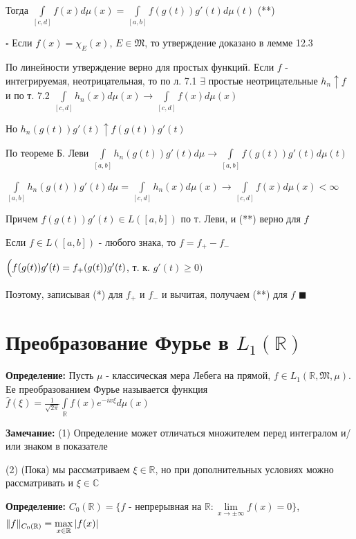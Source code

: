 \documentclass[a4paper]{report}
\newcommand*{\hm}[1]{#1\nobreak\discretionary{}%
            {\hbox{$\mathsurround=0pt #1$}}{}}
\begin{document}
Тогда $\displaystyle\int\limits_{[c,d]}f(x)d\mu(x)=\displaystyle\int\limits_{[a,b]}f(g(t))g'(t)d\mu(t)$ (**)

\noindent $\square$ Если $f(x)=\chi_E(x)$, $E\in\mathfrak M$, то утверждение доказано в лемме 12.3

По линейности утверждение верно для простых функций. Если $f$ - интегрируемая, неотрицательная, то по л. 7.1 $\exists$ простые неотрицательные $h_n\uparrow f$ и по т. 7.2 $\displaystyle\int\limits_{[c,d]}h_n(x)d\mu(x)\to\displaystyle\int\limits_{[c,d]}f(x)d\mu(x)$

Но $h_n(g(t))g'(t)\uparrow f(g(t))g'(t)$

По теореме Б. Леви $\displaystyle\int\limits_{[a,b]}h_n(g(t))g'(t)d\mu\to\displaystyle\int\limits_{[a,b]}f(g(t))g'(t)d\mu(t)$

$\displaystyle\int\limits_{[a,b]}h_n(g(t))g'(t)d\mu=\displaystyle\int\limits_{[c,d]}h_n(x)d\mu(x)\to\displaystyle\int\limits_{[c,d]}f(x)d\mu(x)<\infty$

Причем $f(g(t))g'(t)\in L([a,b])$ по т. Леви, и (**) верно для $f$

Если $f\in L([a,b])$ - любого знака, то $f=f_+-f_-$

$\Bigl(f(g(t))g'(t)=f_+(g(t))g'(t)$, т. к. $g'(t)\ge0\Bigr)$

Поэтому, записывая (*) для $f_+$ и $f_-$ и вычитая, получаем (**) для $f$ $\blacksquare$






\chapter{Преобразование Фурье в $L_1(\mathbb R)$}

\noindent\textbf{Определение:} Пусть $\mu$ - классическая мера Лебега на прямой, $f\in L_1(\mathbb R,\mathfrak M,\mu)$. Ее преобразованием Фурье называется функция $\hat f(\xi)=\displaystyle\frac1{\sqrt{2\pi}}\displaystyle\int\limits_{\mathbb R}f(x)e^{-ix\xi}d\mu(x)$
\bigskip

\noindent\textbf{Замечание:} (1) Определение может отличаться множителем перед интегралом и/или знаком в показателе

(2) (Пока) мы рассматриваем $\xi\in\mathbb R$, но при дополнительных условиях можно рассматривать и $\xi\in\mathbb C$
\bigskip

\noindent\textbf{Определение:} $C_0(\mathbb R)=\{f$ - непрерывная на $\mathbb R\colon\lim\limits_{x\to\pm\infty}f(x)=0\}$, $\|f\|_{C_0(\mathbb R)}\hm=\max\limits_{x\in\mathbb R}|f(x)|$
\bigskip
\end{document}
